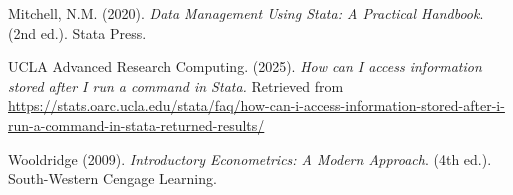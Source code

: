 \documentclass[
]{book}
\begin{document}
Mitchell, N.M. (2020). \emph{Data Management Using Stata: A Practical Handbook}. (2nd ed.). Stata Press.

UCLA Advanced Research Computing. (2025). \emph{How can I access information stored after I run a command in Stata.} Retrieved from \url{https://stats.oarc.ucla.edu/stata/faq/how-can-i-access-information-stored-after-i-run-a-command-in-stata-returned-results/}

Wooldridge (2009). \emph{Introductory Econometrics: A Modern Approach}. (4th ed.). South-Western Cengage Learning.


\end{document}
